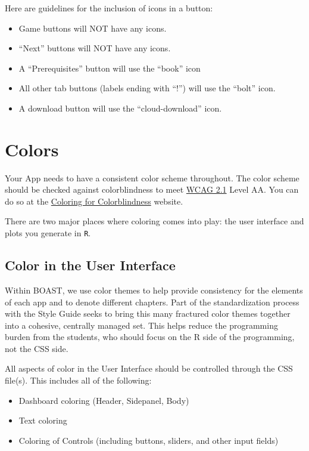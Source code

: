 \documentclass[]{book}
\providecommand{\tightlist}{%
  \setlength{\itemsep}{0pt}\setlength{\parskip}{0pt}}
\begin{document}
Here are guidelines for the inclusion of icons in a button:

\begin{itemize}
\tightlist
\item
  Game buttons will NOT have any icons.
\item
  ``Next'' buttons will NOT have any icons.
\item
  A ``Prerequisites'' button will use the ``book'' icon
\item
  All other tab buttons (labels ending with ``!'') will use the ``bolt'' icon.
\item
  A download button will use the ``cloud-download'' icon.
\end{itemize}

\hypertarget{colors}{%
\section{Colors}\label{colors}}

Your App needs to have a consistent color scheme throughout. The color scheme should be checked against colorblindness to meet \href{https://www.w3.org/WAI/WCAG21/quickref/}{WCAG 2.1} Level AA. You can do so at the \href{https://davidmathlogic.com/colorblind/\#\%23000000-\%23E69F00-\%2356B4E9-\%23009E73-\%23F0E442-\%230072B2-\%23D55E00-\%23CC79A7}{Coloring for Colorblindness} website.

There are two major places where coloring comes into play: the user interface and plots you generate in \texttt{R}.

\hypertarget{colorUI}{%
\subsection{Color in the User Interface}\label{colorUI}}

Within BOAST, we use color themes to help provide consistency for the elements of each app and to denote different chapters. Part of the standardization process with the Style Guide seeks to bring this many fractured color themes together into a cohesive, centrally managed set. This helps reduce the programming burden from the students, who should focus on the R side of the programming, not the CSS side.

All aspects of color in the User Interface should be controlled through the CSS file(s). This includes all of the following:

\begin{itemize}
\tightlist
\item
  Dashboard coloring (Header, Sidepanel, Body)
\item
  Text coloring
\item
  Coloring of Controls (including buttons, sliders, and other input fields)
\end{itemize}
\end{document}
